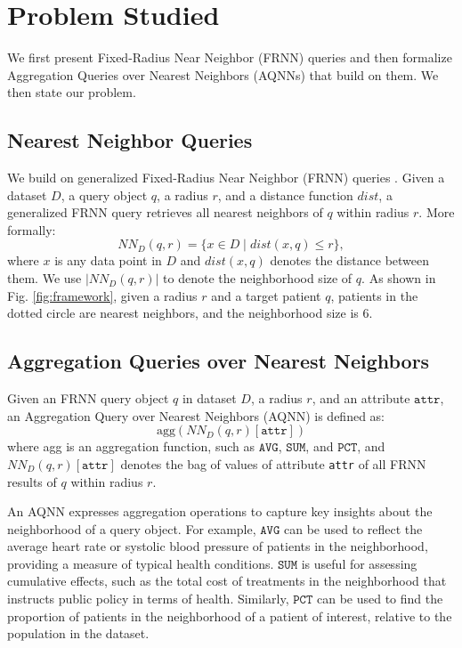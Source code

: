 \section{Problem Studied}\label{sec:def}
We first present Fixed-Radius Near Neighbor (FRNN) queries and then formalize Aggregation Queries over Nearest Neighbors (AQNNs) that build on them. We then state our problem.

\subsection{Nearest Neighbor Queries}\label{subsec:FRNN}
We build on generalized Fixed-Radius Near Neighbor (FRNN) queries \cite{FRNNSurvey}. Given a dataset \( D \), a query object \( q \), a radius \( r \), and a distance function \( dist \), a generalized FRNN query retrieves all nearest neighbors of \( q \) within radius \( r \). More formally:
\[
NN_D(q, r) = \{x \in D \mid dist(x, q) \leq r\},
\]
where \(x\) is any data point in \(D\) and \(dist(x, q)\) denotes the distance between them. We use \(|NN_D(q,r)|\) to denote the neighborhood size of \(q\). As shown in Fig. \ref{fig:framework}, given a radius \(r\) and a target patient \(q\), patients in the dotted circle are nearest neighbors, and the neighborhood size is 6.

\subsection{Aggregation Queries over Nearest Neighbors}\label{subsec:AQNN} 
Given an FRNN query object \(q\) in dataset \(D\), a radius \(r\), and an attribute \(\texttt{attr}\), an Aggregation Query over Nearest Neighbors (AQNN) is defined as:
\[ \text{agg}(NN_D(q,r)[\texttt{attr}]) \]
where agg is an aggregation function, such as $\mathtt{AVG}$, $\mathtt{SUM}$, and $\mathtt{PCT}$, and \(NN_D(q,r)[\texttt{attr}]\) denotes the bag of values of attribute \texttt{attr} of all FRNN results of \(q\) within radius \(r\). 

An AQNN expresses aggregation operations to capture key insights about the neighborhood of a query object. For example, \(\mathtt{AVG}\) can be used to reflect the average heart rate or systolic blood pressure of patients in the neighborhood, providing a measure of typical health conditions. \(\mathtt{SUM}\) is useful for assessing cumulative effects, such as the total cost of treatments in the neighborhood that instructs public policy in terms of health. Similarly, $\mathtt{PCT}$ can be used to find the proportion of patients in the neighborhood of a patient of interest, relative to the population in the dataset.

